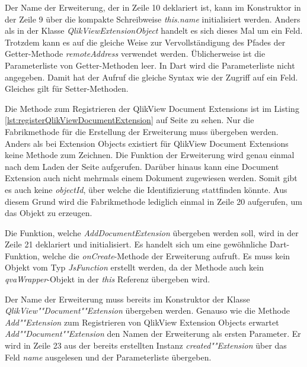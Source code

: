 Der Name der Erweiterung, der in Zeile 10 deklariert ist, kann im Konstruktor in der Zeile 9 über die kompakte Schreibweise \textit{this.name} initialisiert werden. Anders als in der Klasse \textit{QlikViewExtensionObject} handelt es sich dieses Mal um ein Feld. Trotzdem kann es auf die gleiche Weise zur Vervollständigung des Pfades der Getter-Methode \textit{remoteAddress} verwendet werden. Üblicherweise ist die Parameterliste von Getter-Methoden leer. In Dart wird die Parameterliste nicht angegeben. Damit hat der Aufruf die gleiche Syntax wie der Zugriff auf ein Feld. Gleiches gilt für Setter-Methoden.



Die Methode zum Registrieren der QlikView Document Extensions ist im Listing \ref{lst:registerQlikViewDocumentExtension} auf Seite \pageref{lst:registerQlikViewDocumentExtension} zu sehen. Nur die Fabrikmethode für die Erstellung der Erweiterung muss übergeben werden. Anders als bei Extension Objects existiert für QlikView Document Extensions keine Methode zum Zeichnen. Die Funktion der Erweiterung wird genau einmal nach dem Laden der Seite aufgerufen. Darüber hinaus kann eine Document Extension auch nicht mehrmals einem Dokument zugewiesen werden. Somit gibt es auch keine \textit{objectId}, über welche die Identifizierung stattfinden könnte. Aus diesem Grund wird die Fabrikmethode lediglich einmal in Zeile 20 aufgerufen, um das Objekt zu erzeugen. 

Die Funktion, welche \textit{AddDocumentExtension} übergeben werden soll, wird in der Zeile 21 deklariert und initialisiert. Es handelt sich um eine gewöhnliche Dart-Funktion, welche die \textit{onCreate}-Methode der Erweiterung aufruft. Es muss kein Objekt vom Typ \textit{JsFunction} erstellt werden, da der Methode auch kein \textit{qvaWrapper}-Objekt in der \textit{this} Referenz übergeben wird.

Der Name der Erweiterung muss bereits im Konstruktor der Klasse \textit{QlikView""Document""Extension} übergeben werden. Genauso wie die Methode \textit{Add""Extension} zum Registrieren von QlikView Extension Objects erwartet \textit{Add""Document""Extension} den Namen der Erweiterung als ersten Parameter. Er wird in Zeile 23 aus der bereits erstellten Instanz \textit{created""Extension} über das Feld \textit{name} ausgelesen und der Parameterliste übergeben.



